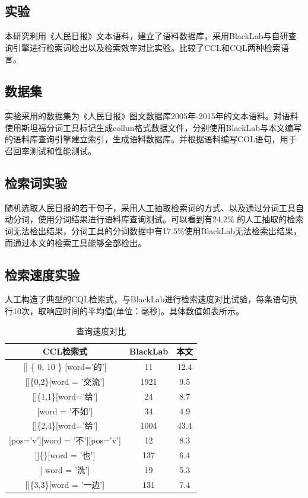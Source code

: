 \documentclass[11pt]{article}
\begin{document}
\begin{CJK*}{UTF8}{gbsn}
\section{实验}

本研究利用《人民日报》文本语料，建立了语料数据库，采用BlackLab与自研查询引擎进行检索词检出以及检索效率对比实验。比较了CCL和CQL两种检索语言。

\subsection{数据集}

实验采用的数据集为《人民日报》图文数据库2005年-2015年的文本语料。对语料使用斯坦福分词工具标记生成collun格式数据文件，分别使用BlackLab与本文编写的语料库查询引擎建立索引，生成语料数据库。并根据语料编写COL语句，用于召回率测试和性能测试。

\subsection{检索词实验}

随机选取人民日报的若干句子，采用人工抽取检索词的方式、以及通过分词工具自动分词，使用分词结果进行语料库查询测试。可以看到有24.2\% 的人工抽取的检索词无法检出结果，分词工具的分词数据中有17.5\%使用BlackLab无法检索出结果，而通过本文的检索工具能够全部检出。 

\subsection{检索速度实验}

人工构造了典型的CQL检索式，与BlackLab进行检索速度对比试验，每条语句执行10次，取响应时间的平均值(单位：毫秒)。具体数值如表所示。

\begin{table}[h]
	\begin{center}
		\begin{tabular}{c|c|c}
			\hline \bf CCL检索式 & \bf BlackLab & \bf 本文 \\ \hline
			[word=“的”][] \{ 0, 10 \} [word='的'] & 11 & 12.4 \\ \hline
			[word = '文化'][]\{0,2\}[word = '交流'] & 1921 & 9.5 \\
			\hline
			[word='把'][]\{1,1\}[word='给'] & 24 & 8.7 \\
			\hline
			[word = '与其'][word = '不如'] & 34 & 4.9 \\
			\hline
			[word='把'  \textbar word='被'][]\{2,4\}[word='给'] & 1004 & 43.4 \\
			\hline
			[word = '爱'][pos='v'][word = '不'][pos='v'] & 12 & 8.3 \\
			\hline
			[word = '宁可'][]\{\}[word = '也'] & 137 & 6.4 \\
			\hline
			[word = '澡'][ word = '洗'] & 19 & 5.3 \\
			\hline
			[word = '一边'][]\{3,3\}[word = '一边'] & 131 & 7.4 \\
			\hline
		\end{tabular}
	\end{center}
	\caption{\label{speed-table} 查询速度对比}
\end{table}


\end{CJK*}
\end{document}
